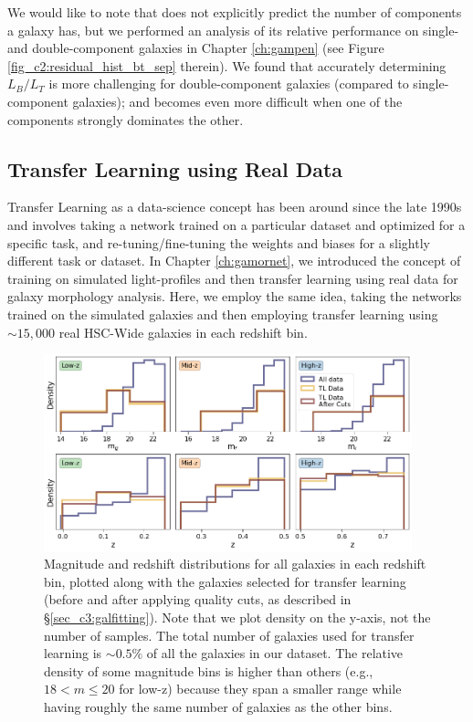 We would like to note that \gampen{} does not explicitly predict the number of components a galaxy has, but we performed an analysis of its relative performance on single- and double-component galaxies in Chapter \ref{ch:gampen} (see Figure \ref{fig_c2:residual_hist_bt_sep} therein). We found that accurately determining $L_B/L_T$ is more challenging for double-component galaxies (compared to single-component galaxies); and becomes even more difficult when one of the components strongly dominates the other.

\subsection{Transfer Learning using Real Data} 
\label{sec_c3:transfer_learning}

Transfer Learning as a data-science concept has been around since the late 1990s \citep[e.g.,][]{blum_1998} and involves taking a network trained on a particular dataset and optimized for a specific task, and re-tuning/fine-tuning the weights and biases for a slightly different task or dataset.  In Chapter \ref{ch:gamornet}, we introduced the concept of training on simulated light-profiles and then transfer learning using real data for galaxy morphology analysis. Here, we employ the same idea, taking the networks trained on the simulated galaxies and then employing transfer learning using $\sim15,000$ real HSC-Wide galaxies in each redshift bin.

\begin{figure}[htb]
    \centering
    \includegraphics[width = 0.95\textwidth]{tl_para_dist.png}
    \caption{Magnitude and redshift distributions for all galaxies in each redshift bin, plotted along with the galaxies selected for transfer learning (before and after applying quality cuts, as described in \S \ref{sec_c3:galfitting}). Note that we plot density on the y-axis, not the number of samples. The total number of galaxies used for transfer learning is $\sim0.5\%$ of all the galaxies in our dataset. The relative density of some magnitude bins is higher than others (e.g., $18 < m \leq 20$ for low-z) because they span a smaller range while having roughly the same number of galaxies as the other bins.}
    \label{fig_c3:tl_para_dist}
\end{figure}

